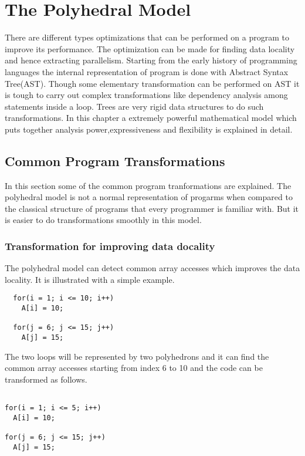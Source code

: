 \documentclass[a4paper,12pt]{book}
\begin{document}
\chapter{The Polyhedral Model}

There are different types optimizations that can be performed on a program to improve its
performance. The optimization can be made for finding data locality and hence extracting
parallelism. Starting from the early history of programming languages the internal representation
of program is done with Abstract Syntax Tree(AST). Though some elementary transformation can
be performed on AST it is tough to carry out complex transformations like dependency analysis among
statements inside a loop. Trees are very rigid data structures to do such transformations.
In this chapter a extremely powerful mathematical model which puts together analysis power,expressiveness and flexibility is explained in detail.

\section{Common Program Transformations}

In this section some of the common program tranformations are explained. The
polyhedral model is not a normal representation of progarms when compared to the
classical structure of programs that every programmer is familiar with. But
it is easier to do transformations smoothly in this model.

\subsection{Transformation for improving data docality}

The polyhedral model can detect common array accesses which improves the data locality. It is
illustrated with a simple example.
{\footnotesize
\begin{lstlisting}
  for(i = 1; i <= 10; i++)
    A[i] = 10;
  
  for(j = 6; j <= 15; j++)
    A[j] = 15;
\end{lstlisting}
}

The two loops will be represented by two polyhedrons and it can find the common 
array accesses starting from index 6 to 10 and the code can be transformed as follows.

{\footnotesize
\begin{lstlisting}

for(i = 1; i <= 5; i++)
  A[i] = 10;

for(j = 6; j <= 15; j++)
  A[j] = 15;
\end{lstlisting}
}


\end{document}
